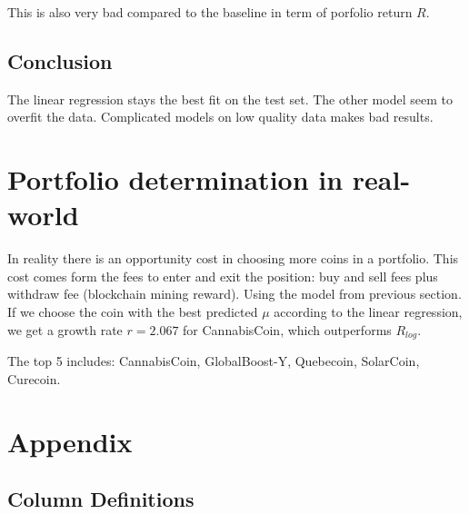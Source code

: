\documentclass[11pt, english, letterpaper]{article}
\begin{document}
This is also very bad compared to the baseline in term of porfolio return $R$.

\subsection{Conclusion}

The linear regression stays the best fit on the test set. The other model seem to overfit the data. Complicated models on low quality data makes bad results.

\section{Portfolio determination in real-world}

In reality there is an opportunity cost in choosing more coins in a portfolio. This cost comes form the fees to enter and exit the position: buy and sell fees plus withdraw fee (blockchain mining reward).
Using the model from previous section. If we choose the coin with the best predicted $\mu$ according to the linear regression, we get a growth rate $r = 2.067$ for CannabisCoin, which outperforms $R_{log}$.

The top 5 includes: CannabisCoin, GlobalBoost-Y, Quebecoin, SolarCoin, Curecoin.


\newpage

\section{Appendix}

\subsection{Column Definitions}


\end{document}
